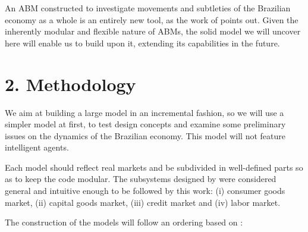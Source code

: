 \documentclass[11pt,]{article}
\begin{document}
An ABM constructed to investigate movements and subtleties of the
Brazilian economy as a whole is an entirely new tool, as the work of
\citet{furtado} points out. Given the inherently modular and flexible
nature of ABMs, the solid model we will uncover here will enable us to
build upon it, extending its capabilities in the future.

\section{2. Methodology}\label{methodology}

We aim at building a large model in an incremental fashion, so we will
use a simpler model at first, to test design concepts and examine some
preliminary issues on the dynamics of the Brazilian economy. This model
will not feature intelligent agents.

Each model should reflect real markets and be subdivided in well-defined
parts so as to keep the code modular. The subsystems designed by
\citet{deissenberg1} were considered general and intuitive enough to be
followed by this work: (i) consumer goods market, (ii) capital goods
market, (iii) credit market and (iv) labor market.

The construction of the models will follow an ordering based on
\citet{helbing}:
\end{document}
